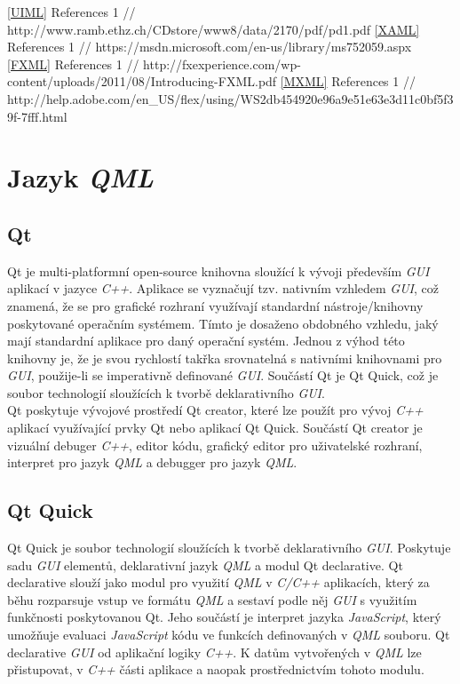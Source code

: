 \documentclass[11pt,twoside,a4paper]{book}
\begin{document}
{{\begin{ttemize}
{{ \ref{UIML} References 1
// http://www.ramb.ethz.ch/CDstore/www8/data/2170/pdf/pd1.pdf
 \ref{XAML} References 1
// https://msdn.microsoft.com/en-us/library/ms752059.aspx
 \ref{FXML} References 1
// http://fxexperience.com/wp-content/uploads/2011/08/Introducing-FXML.pdf
 \ref{MXML} References 1
// http://help.adobe.com/en_US/flex/using/WS2db454920e96a9e51e63e3d11c0bf5f39f-7fff.html

\section{\label{SEC:QML}Jazyk \textit{QML}}
\subsection{Qt}
Qt je multi-platformní open-source knihovna sloužící k vývoji především \textit{GUI} aplikací v jazyce \textit{C++}. Aplikace se vyznačují tzv. nativním vzhledem \textit{GUI}, což znamená, že se pro grafické rozhraní využívají standardní nástroje/knihovny poskytované operačním systémem. Tímto je dosaženo obdobného vzhledu, jaký mají standardní aplikace pro daný operační systém. Jednou z výhod této knihovny je, že je svou rychlostí takřka srovnatelná s nativními knihovnami pro \textit{GUI}, použije-li se imperativně definované \textit{GUI}. Součástí Qt je Qt Quick, což je soubor technologií sloužících k tvorbě deklarativního \textit{GUI}.\\
Qt poskytuje vývojové prostředí Qt creator, které lze použít pro vývoj \textit{C++} aplikací využívající prvky Qt nebo aplikací Qt Quick. Součástí Qt creator je vizuální debuger \textit{C++}, editor kódu, grafický editor pro uživatelské rozhraní, interpret pro jazyk \textit{QML} a debugger pro jazyk \textit{QML}.

\subsection{Qt Quick}
Qt Quick je soubor technologií sloužících k tvorbě deklarativního \textit{GUI}. Poskytuje sadu \textit{GUI} elementů, deklarativní jazyk \textit{QML} a modul Qt declarative. Qt declarative slouží jako modul pro využití \textit{QML} v \textit{C/C++} aplikacích, který za běhu rozparsuje vstup ve formátu \textit{QML} a sestaví podle něj \textit{GUI} s využitím funkčnosti poskytovanou Qt. Jeho součástí je interpret jazyka \textit{JavaScript}, který umožňuje evaluaci \textit{JavaScript} kódu ve funkcích definovaných v \textit{QML} souboru. Qt declarative \textit{GUI} od aplikační logiky \textit{C++}. K datům vytvořených v \textit{QML} lze přistupovat, v \textit{C++} části aplikace a naopak prostřednictvím tohoto modulu.

}}
\end{ttemize}}}
\end{document}

